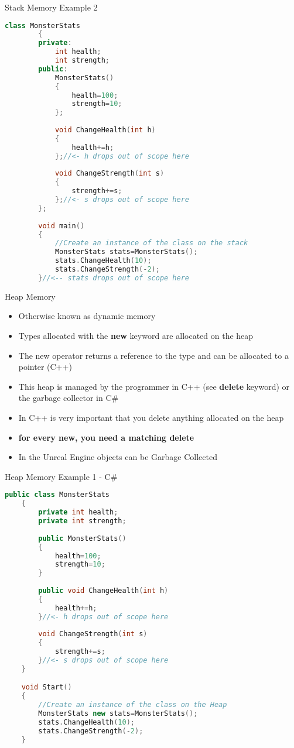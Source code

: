 \begin{frame}[fragile]{Stack Memory Example 2}
	\begin{lstlisting}[language=C++,basicstyle=\tiny,]
		class MonsterStats
		{
		private:
			int health;
			int strength;
		public:
			MonsterStats()
			{
				health=100;
				strength=10;
			};
	
			void ChangeHealth(int h)
			{
				health+=h;
			};//<- h drops out of scope here
	
			void ChangeStrength(int s)
			{
				strength+=s;
			};//<- s drops out of scope here
		};
	
		void main()
		{		
			//Create an instance of the class on the stack
			MonsterStats stats=MonsterStats();
			stats.ChangeHealth(10);
			stats.ChangeStrength(-2);
		}//<-- stats drops out of scope here
	\end{lstlisting}
\end{frame}

\begin{frame}{Heap Memory}
	\begin{itemize}
	\pause \item Otherwise known as dynamic memory
	\pause \item Types allocated with the \textbf{new} keyword are allocated on the heap
	\pause \item The new operator returns a reference to the type and can be allocated to a pointer (C++)
	\pause \item This heap is managed by the programmer in C++ (see \textbf{delete} keyword) or the garbage collector in C\#
	\pause \item In C++ is very important that you delete anything allocated on the heap
	\pause \item \textbf{for every new, you need a matching delete}
	\pause \item In the Unreal Engine objects can be Garbage Collected
	\end{itemize}
\end{frame}

\begin{frame}[fragile]{Heap Memory Example 1 - C\#}
\begin{lstlisting}[language=C++,basicstyle=\tiny,]
	public class MonsterStats
	{
		private int health;
		private int strength;
		
		public MonsterStats()
		{
			health=100;
			strength=10;
		}
	
		public void ChangeHealth(int h)
		{
			health+=h;
		}//<- h drops out of scope here
	
		void ChangeStrength(int s)
		{
			strength+=s;
		}//<- s drops out of scope here
	}

	void Start()
	{		
		//Create an instance of the class on the Heap
		MonsterStats new stats=MonsterStats();
		stats.ChangeHealth(10);
		stats.ChangeStrength(-2);
	}	
\end{lstlisting}
\end{frame}

